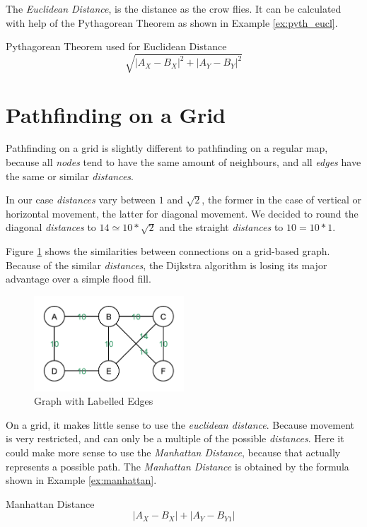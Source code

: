 The \emph{Euclidean Distance},
is the distance as the crow flies.
It can be calculated with help of the Pythagorean Theorem as shown in Example \ref{ex:pyth_eucl}.
\begin{example}{Pythagorean Theorem used for Euclidean Distance}
  \label{ex:pyth_eucl}
  \begin{equation}
	\sqrt{|A_{X}-B_{X}|^{2}+|A_{Y}-B_{Y}|^{2}}
  \end{equation}
\end{example}


\section{Pathfinding on a Grid}
Pathfinding on a grid is slightly different to pathfinding on a regular map,
because all \emph{nodes} tend to have the same amount of neighbours,
and all \emph{edges} have the same or similar \emph{distances}.

In our case \emph{distances} vary between $1$ and $\sqrt{2}$,
the former in the case of vertical or horizontal movement,
the latter for diagonal movement.
We decided to round the diagonal \emph{distances} to $14\simeq10*\sqrt{2}$ and
the straight \emph{distances} to $10=10*1$.

Figure \ref{fig:graph_cost} shows the similarities between connections on a grid-based graph.
Because of the similar \emph{distances},
the Dijkstra algorithm is losing its major advantage over a simple flood fill.
\begin{figure}[htp]
	\centering
	\includegraphics[width=0.5\textwidth]{figures/path/graph_values.pdf}
	\caption{Graph with Labelled Edges}
	\label{fig:graph_cost}
\end{figure}
%
On a grid, it makes little sense to use the \emph{euclidean distance}.
Because movement is very restricted,
and can only be a multiple of the possible \emph{distances}.
Here it could make more sense to use the \emph{Manhattan Distance},
because that actually represents a possible path.
The \emph{Manhattan Distance} is obtained by the formula shown in Example \ref{ex:manhattan}.
\begin{example}{Manhattan Distance}
  \label{ex:manhattan}
  \begin{equation}
	|A_{X}-B_{X}|+|A_{Y}-B_{Y1}|
  \end{equation}
\end{example}


